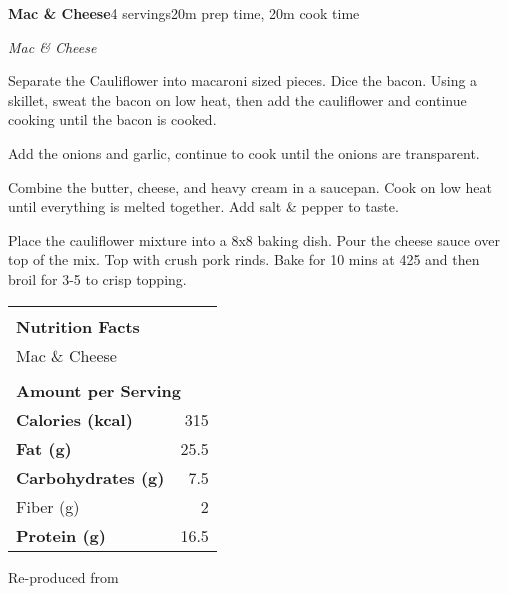 \documentclass[../recipe-collections/cooking.tex]{subfiles}
\begin{document}
\begin{recipe}{\textbf{Mac \& Cheese}}{4 servings}{20m prep time, 20m cook time}

  \freeform{}\textit{Mac \& Cheese}


  Separate the Cauliflower into macaroni sized pieces. Dice the bacon. Using a skillet,
  sweat the bacon on low heat, then add the cauliflower and continue cooking until the 
  bacon is cooked. 


  Add the onions and garlic, continue to cook until the onions are transparent.


  Combine the butter, cheese, and heavy cream in a saucepan. Cook on low heat until everything
  is melted together. Add salt \& pepper to taste.


  Place the cauliflower mixture into a 8x8 baking dish. Pour the cheese sauce over top of the mix.
  Top with crush pork rinds. Bake for 10 mins at 425\0 and then broil for 3-5 to crisp topping.

  \bigskip
  \centering
  \begin{tabular}{|lr|}
    \hline
                                        &                                       \\
    \multicolumn{2}{|l|}{\huge{\textbf{\textrm{Nutrition Facts}}}}              \\
    \multicolumn{2}{|l|}{\textrm{Mac \& Cheese}}                                \\ 
                                        &                                       \\
    \multicolumn{2}{|l|}{\footnotesize{\textbf{\textrm{Amount per Serving}}}}   \\ \hline
    \textbf{\textrm{Calories (kcal)}}   & \textrm{315}                          \\ \hline
    \textbf{\textrm{Fat (g)}}           & \textrm{25.5}                         \\ \hline
    \textbf{\textrm{Carbohydrates (g)}} & \textrm{7.5}                          \\ \hline
    \hspace{2mm} \textrm{Fiber (g)}     & \textrm{2}                            \\ \hline
    \textbf{\textrm{Protein (g)}}       & \textrm{16.5}                         \\ \hline
  \end{tabular}

  \freeform{}\hrulefill{}

\end{recipe}

Re-produced from  \autocite{gaedke_2021}
\end{document}

